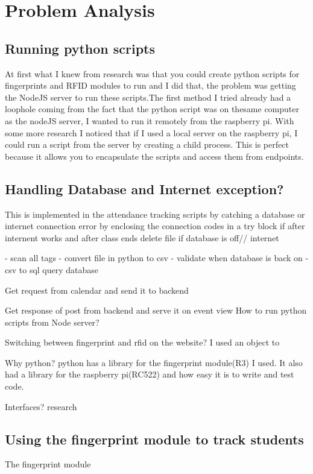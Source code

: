 \section*{Problem Analysis}

\subsection*{Running python scripts}
At first what I knew from research was that you could create python scripts for fingerprints and RFID modules to run and I did that, the problem was getting the NodeJS server to run these scripts.The first method I tried already had a loophole coming from the fact that the python script was on thesame computer as the nodeJS server, I wanted to run it remotely from the raspberry pi. With some more research I noticed that if I used a local server on the raspberry pi, I could run a script from the server by creating a child process. This is perfect because it allows you to encapsulate the scripts and access them from endpoints.

\subsection*{Handling Database and Internet exception?}
This is implemented in the attendance tracking scripts by catching a database or internet connection error by enclosing the connection codes in a try block
if after internent works and after class ends delete file
if database is off// internet

- scan all tags
- convert file in python to csv
- validate when database is back on
- csv to sql query database

Get request from calendar and send it to backend

Get response of post from backend and serve it on event view
How to run python scripts from Node server?


Switching between fingerprint and rfid on the website?
I used an object to 


Why python?
python has a library for the fingerprint module(R3) I used. It also had a library for the raspberry pi(RC522) and how easy it is to write and test code.

Interfaces?
research
\subsection*{Using the fingerprint module to track students}
The fingerprint module 

